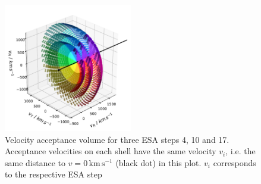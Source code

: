 %
\begin{figure}[h]
	\includegraphics[width=0.5\textwidth]{Figures/col_shells.pdf}
	\centering
	\caption{Velocity acceptance volume for three ESA steps 4, 10 and 17. Acceptance velocities on each shell have the same velocity $v_i$, i.e. the same distance to $v = 0\,\mathrm{km\,s^{-1}}$ (black dot) in this plot. $v_i$ corresponds to the respective ESA step}
	\label{fig:coll_shells}
\end{figure}
%
%
%
